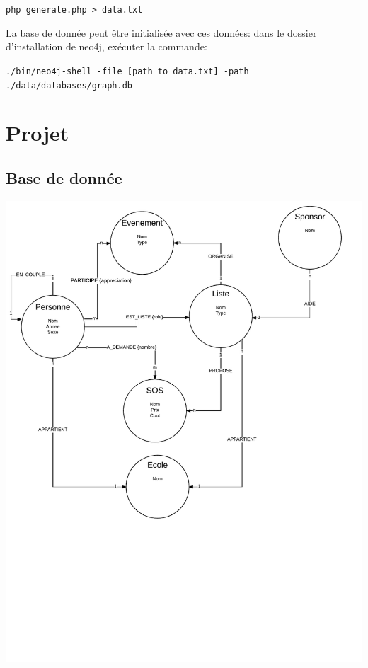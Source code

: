 \documentclass[a4paper,oneside,1pt]{article}
\begin{document}
\texttt{php generate.php > data.txt}

La base de donnée peut être initialisée avec ces données: dans le dossier d'installation de neo4j, exécuter la commande:

\texttt{./bin/neo4j-shell -file [path\_to\_data.txt] -path ./data/databases/graph.db}

\section{Projet}

\subsection{Base de donnée}

\includegraphics[width=18cm,trim = 0cm 8cm 0cm 0cm, clip=true]{schema.pdf}
\end{document}

